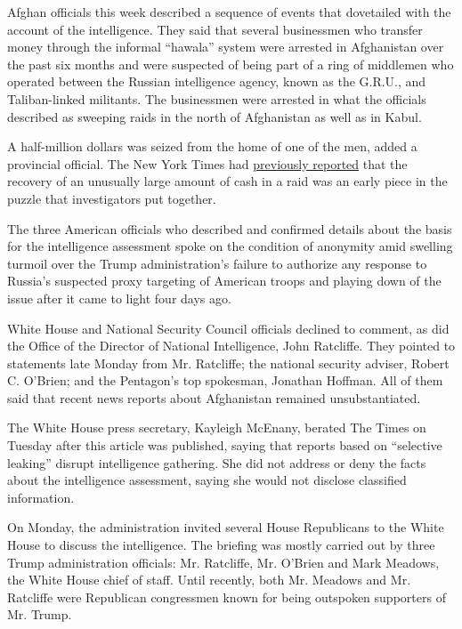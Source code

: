 Afghan officials this week described a sequence of events that
dovetailed with the account of the intelligence. They said that several
businessmen who transfer money through the informal ``hawala'' system
were arrested in Afghanistan over the past six months and were suspected
of being part of a ring of middlemen who operated between the Russian
intelligence agency, known as the G.R.U., and Taliban-linked militants.
The businessmen were arrested in what the officials described as
sweeping raids in the north of Afghanistan as well as in Kabul.

A half-million dollars was seized from the home of one of the men, added
a provincial official. The New York Times had
\href{https://www.nytimes.com/2020/06/28/us/politics/russian-bounties-warnings-trump.html}{previously
reported} that the recovery of an unusually large amount of cash in a
raid was an early piece in the puzzle that investigators put together.

The three American officials who described and confirmed details about
the basis for the intelligence assessment spoke on the condition of
anonymity amid swelling turmoil over the Trump administration's failure
to authorize any response to Russia's suspected proxy targeting of
American troops and playing down of the issue after it came to light
four days ago.

White House and National Security Council officials declined to comment,
as did the Office of the Director of National Intelligence, John
Ratcliffe. They pointed to statements late Monday from Mr. Ratcliffe;
the national security adviser, Robert C. O'Brien; and the Pentagon's top
spokesman, Jonathan Hoffman. All of them said that recent news reports
about Afghanistan remained unsubstantiated.

The White House press secretary, Kayleigh McEnany, berated The Times on
Tuesday after this article was published, saying that reports based on
``selective leaking'' disrupt intelligence gathering. She did not
address or deny the facts about the intelligence assessment, saying she
would not disclose classified information.

On Monday, the administration invited several House Republicans to the
White House to discuss the intelligence. The briefing was mostly carried
out by three Trump administration officials: Mr. Ratcliffe, Mr. O'Brien
and Mark Meadows, the White House chief of staff. Until recently, both
Mr. Meadows and Mr. Ratcliffe were Republican congressmen known for
being outspoken supporters of Mr. Trump.

